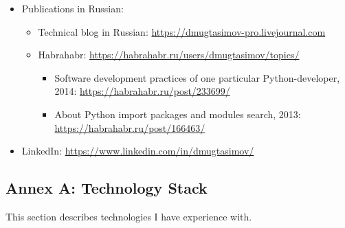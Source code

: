 \documentclass[a4paper,8pt]{extarticle}
\begin{document}
\begin{itemize}
        \vspace{2pt}  %
        \begin{itemize}
            \setlength{\itemsep}{2pt}
            \item My Python software development practices: \url{https://dmugtasimov-tech.blogspot.ru/2016/12/my-python-software-development-practices.html}
            \item Pascal’s Triangle (detailed description of optimization techniques for an academic task from Python code optimization to refactoring to Assembler):\\
            \url{https://dmugtasimov-tech.blogspot.ru/2016/02/pascals-triangle.html}
            \item My closed source repositories statistics: \url{https://dmugtasimov-tech.blogspot.ru/2017/04/my-repo-stats.html}
        \end{itemize}
    \item Publications in Russian:
        \vspace{2pt}  %
        \begin{itemize}
            \item Technical blog in Russian: \url{https://dmugtasimov-pro.livejournal.com}
            \item Habrahabr: \url{https://habrahabr.ru/users/dmugtasimov/topics/}
            \begin{itemize}
                \item Software development practices of one particular Python-developer, 2014: \url{https://habrahabr.ru/post/233699/}
                \item About Python import packages and modules search, 2013: \url{https://habrahabr.ru/post/166463/}
            \end{itemize}
        \end{itemize}
    \item LinkedIn: \url{https://www.linkedin.com/in/dmugtasimov/}
\end{itemize}

\subsection*{Annex A: Technology Stack}
This section describes technologies I have experience with.
\end{document}
